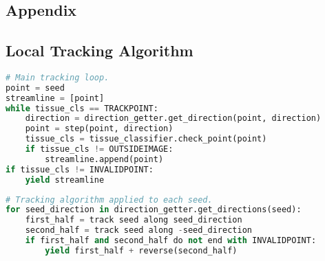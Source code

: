 \begin{appendices}
\section{Appendix}
\subsection{Local Tracking Algorithm}
\label{appendix:algo}



\begin{lstlisting}[language=python]
# Main tracking loop.
point = seed
streamline = [point]
while tissue_cls == TRACKPOINT:
    direction = direction_getter.get_direction(point, direction)
    point = step(point, direction)
    tissue_cls = tissue_classifier.check_point(point)
    if tissue_cls != OUTSIDEIMAGE:
        streamline.append(point)
if tissue_cls != INVALIDPOINT:
    yield streamline
\end{lstlisting}

\begin{lstlisting}[language=python]
# Tracking algorithm applied to each seed.
for seed_direction in direction_getter.get_directions(seed):
    first_half = track seed along seed_direction
    second_half = track seed along -seed_direction
    if first_half and second_half do not end with INVALIDPOINT:
        yield first_half + reverse(second_half)
\end{lstlisting}

\end{appendices}
